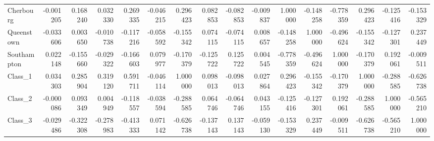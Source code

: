 \begin{tabular}{lrrrrrrrrrrrrrrr}
Cherbourg   &    -0.001205 &  0.168240 &  0.032330 &  0.269335 &    -0.046215 &   0.296423 &  0.082853 & -0.082853 &    -0.009837 &   1.000000 &   -0.148258 &    -0.778359 &  0.296423 & -0.125416 & -0.153329 \\
Queenstown  &    -0.033606 &  0.003650 & -0.010738 & -0.117216 &    -0.058592 &  -0.155342 &  0.074115 & -0.074115 &     0.008657 &  -0.148258 &    1.000000 &    -0.496624 & -0.155342 & -0.127301 &  0.237449 \\
Southampton &     0.022148 & -0.155660 & -0.029322 & -0.166603 &     0.079977 &  -0.170379 & -0.125722 &  0.125722 &     0.004545 &  -0.778359 &   -0.496624 &     1.000000 & -0.170379 &  0.192061 & -0.009511 \\
Class\_1     &     0.034303 &  0.285904 &  0.319120 &  0.591711 &    -0.046114 &   1.000000 &  0.098013 & -0.098013 &     0.027864 &   0.296423 &   -0.155342 &    -0.170379 &  1.000000 & -0.288585 & -0.626738 \\
Class\_2     &    -0.000086 &  0.093349 &  0.004949 & -0.118557 &    -0.038594 &  -0.288585 &  0.064746 & -0.064746 &     0.043155 &  -0.125416 &   -0.127301 &     0.192061 & -0.288585 &  1.000000 & -0.565210 \\
Class\_3     &    -0.029486 & -0.322308 & -0.278983 & -0.413333 &     0.071142 &  -0.626738 & -0.137143 &  0.137143 &    -0.059130 &  -0.153329 &    0.237449 &    -0.009511 & -0.626738 & -0.565210 &  1.000000 \\
\bottomrule
\end{tabular}

